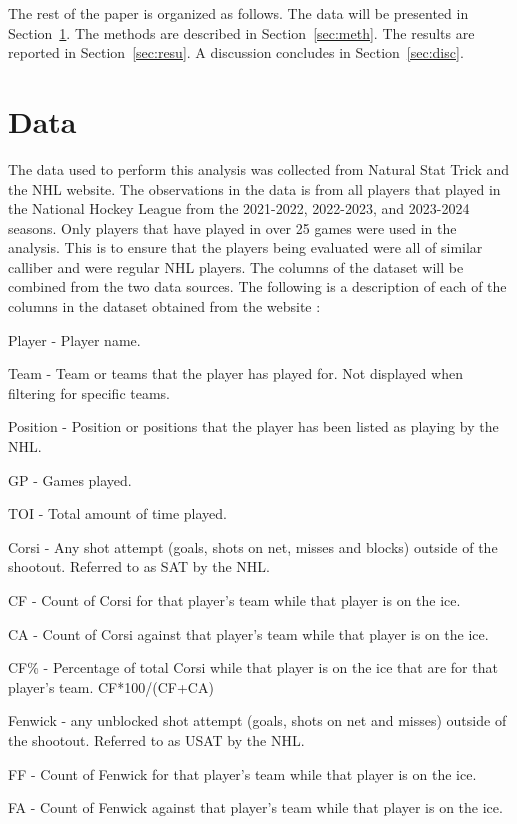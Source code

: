 \documentclass[12pt]{article}
\begin{document}
The rest of the paper is organized as follows.
The data will be presented in Section~\ref{sec:data}.
The methods are described in Section~\ref{sec:meth}.
The results are reported in Section~\ref{sec:resu}.
A discussion concludes in Section~\ref{sec:disc}.


\section{Data}
\label{sec:data}

The data used to perform this analysis was collected from Natural Stat Trick and the NHL website. The observations in the data
is from all players that played in the National Hockey League from the 2021-2022, 2022-2023, and 2023-2024 seasons. Only players
that have played in over 25 games were used in the analysis. This is to ensure that the players being evaluated were all of similar 
calliber and were regular NHL players. The columns of the dataset will be combined from the two data sources. The following is a 
description of each of the columns in the dataset obtained from the website \cite{natural_stat_trick}:

Player - Player name.

Team - Team or teams that the player has played for. Not displayed when filtering for specific teams.

Position - Position or positions that the player has been listed as playing by the NHL.

GP - Games played.

TOI - Total amount of time played.

Corsi - Any shot attempt (goals, shots on net, misses and blocks) outside of the shootout. Referred to as SAT by the NHL.

CF - Count of Corsi for that player's team while that player is on the ice.

CA - Count of Corsi against that player's team while that player is on the ice.

CF\% - Percentage of total Corsi while that player is on the ice that are for that player's team. CF*100/(CF+CA)

Fenwick - any unblocked shot attempt (goals, shots on net and misses) outside of the shootout. Referred to as USAT by the NHL.

FF - Count of Fenwick for that player's team while that player is on the ice.

FA - Count of Fenwick against that player's team while that player is on the ice.
\end{document}
